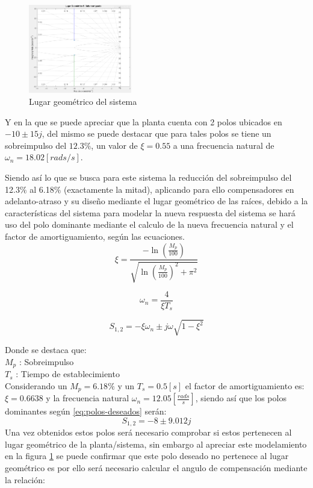 \documentclass[conference]{IEEEtran}
\begin{document}
	\begin{figure}[h]
		\centering
		\includegraphics[width=0.4\textwidth]{media/lgr_planta}
		\caption{Lugar geométrico del sistema}
		\label{fig:lgrplanta}
	\end{figure}
	
	Y en la que se puede apreciar que la planta cuenta con 2 polos ubicados en $-10 \pm 15j$, del mismo se puede destacar que para tales polos se tiene un sobreimpulso del $12.3\%$, un valor de $\xi = 0.55$ a una frecuencia natural de $\omega_n = 18.02 [rads/s]$.
	
	Siendo así lo que se busca para este sistema la reducción del sobreimpulso del 12.3$\%$ al 6.18$\%$ (exactamente la mitad), aplicando para ello  compensadores en adelanto-atraso y su diseño mediante el lugar geométrico de las raíces, debido a la características del sistema para modelar la nueva respuesta del sistema se hará uso del polo dominante mediante el calculo de la nueva frecuencia natural y el factor de amortiguamiento, según las ecuaciones.
	\begin{equation}
		\xi = \frac{-\ln(\frac{M_p}{100})}{\sqrt{\ln(\frac{M_p}{100})^2 + \pi^2}}
		\label{eq:factor-amortiguamiento} 	
	\end{equation}
	
	\begin{equation}
		\omega_n = \frac{4}{\xi T_s}
		\label{eq:frecuencia-natural}
	\end{equation}
	
	\begin{equation}
		S_{1,2} = -\xi \omega_n \pm j\omega \sqrt{1-\xi^2}
		\label{eq:polos-deseados}
	\end{equation}
		
	Donde se destaca que: \\
	$M_p$ : Sobreimpulso \\
	$T_s$ : Tiempo de establecimiento\\
	
	Considerando un $M_p = 6.18\% $ y un $T_s = 0.5[s]$ el factor de amortiguamiento es: $\xi = 0.6638$ y la frecuencia natural $\omega_n = 12.05 [\frac{rads}{s}]$, siendo así que los polos dominantes según \ref{eq:polos-deseados} serán:
	\begin{equation}
		S_{1,2} = -8 \pm 9.012j
		\label{eq:polos-dominantes-sub}
	\end{equation}
	Una vez obtenidos estos polos será necesario comprobar si estos pertenecen al lugar geométrico de la planta/sistema, sin embargo al apreciar este modelamiento en la figura \ref{fig:lgrplanta} se puede confirmar que este polo deseado no pertenece al lugar geométrico es por ello será necesario calcular el angulo de compensación mediante la relación:
	
\end{document}
